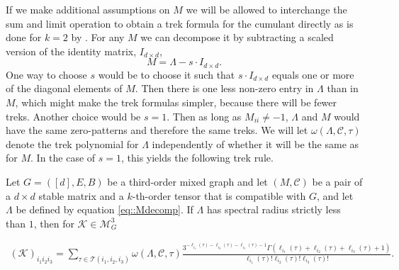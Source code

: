 \documentclass{biometrika}
\begin{document}
If we make additional assumptions on $M$ we will be allowed to interchange the sum and limit operation to obtain a trek formula for the cumulant directly as is done for $k=2$ by \cite{hansen2024trekrulelyapunovequation}. For any $M$ we can decompose it by subtracting a scaled version of the identity matrix, $I_{d \times d}$,
\begin{equation}
    \label{eq::Mdecomp}
    M = \Lambda - s \cdot I_{d \times d}. 
\end{equation}
One way to choose $s$ would be to choose it such that $s \cdot I_{d \times d}$ equals one or more of the diagonal elements of $M$. Then there is one less non-zero entry in $\Lambda$ than in $M$, which might  make the trek formulas simpler, because there will be fewer treks. Another choice would be $s = 1$.
Then as long as $M_{ii} \neq -1$, $\Lambda$ and $M$ would have the same zero-patterns and therefore the same treks. We will let $\omega(\Lambda, \mathcal{C}, \tau)$ denote the trek polynomial for $\Lambda$ independently of whether it will be the same as for $M$. In the case of $s = 1$, this yields the following trek rule. 
\begin{proposition}
\label{prop::LambdaTrekRuleThird}
    Let $G = ([d],E,B)$ be a third-order mixed graph and let $(M,\mathcal{C})$ be a pair of a $d\times d$ stable matrix and a $k$-th-order tensor that is compatible with $G$, 
    and let $\Lambda$ be defined by equation \eqref{eq::Mdecomp}. 
    If $\Lambda$ has spectral radius strictly less than $1$, then for $\mathcal{K}  \in \mathcal{M}^3_{G}$

    \begin{align*}
        (\mathcal{K} )_{i_1 i_2 i_3} = \sum_{\tau \in \mathcal{T}(i_1, i_2, i_3)} \omega(\Lambda, \mathcal{C}, \tau)  \frac{3^{-\ell_{i_1}(\tau)-\ell_{i_2}(\tau)-\ell_{i_3}(\tau)-1}  \Gamma(\ell_{i_1}(\tau)+\ell_{i_2}(\tau)+\ell_{i_3}(\tau)+1)}{\ell_{i_1}(\tau)! \ell_{i_2}(\tau)! \ell_{i_3}(\tau)!}. 
    \end{align*}
\end{proposition}   
\end{document}
